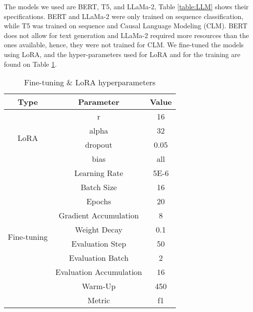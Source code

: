 The models we used  are BERT, T5, and LLaMa-2, Table \ref{table:LLM} shows their specifications. 
BERT and LLaMa-2 were only trained on sequence classification, while T5 was trained on sequence and Causal Language Modeling (CLM). BERT  does not allow for text generation and LLaMa-2 required more resources than the ones available, hence, they were not trained for CLM.  We fine-tuned the models using LoRA, and the hyper-parameters used for LoRA and for the training are found on Table \ref{table:hyperparameters}. 

\begin{table}[H]
	\centering
	\caption{Fine-tuning \& LoRA hyperparameters}
	{\footnotesize
	\begin{tabular}{||c | c | c||} 
		\hline
		\textbf{Type} & \textbf{Parameter} & \textbf{Value} \\
		\hline
		\multirow{4}{4.75em}{LoRA} & r & 16  \\ \cline{2-3}
		& alpha & 32  \\ \cline{2-3}
		& dropout & 0.05 \\ \cline{2-3}
		& bias & all \\
		\hline 
		\multirow{10}{4.75em}{Fine-tuning} & Learning Rate & 5E-6\\ \cline{2-3}
		& Batch Size & 16 \\ \cline{2-3}
		& Epochs & 20 \\ \cline{2-3}
		& Gradient Accumulation & 8 \\ \cline{2-3}
		& Weight Decay & 0.1 \\ \cline{2-3}
		& Evaluation Step & 50 \\ \cline{2-3}
		& Evaluation Batch & 2 \\ \cline{2-3}
		& Evaluation Accumulation & 16 \\ \cline{2-3}
		& Warm-Up & 450 \\ \cline{2-3}
		& Metric & f1 \\ \cline{2-3}
		\hline
	\end{tabular}
	}
	\label{table:hyperparameters}
\end{table}
%
